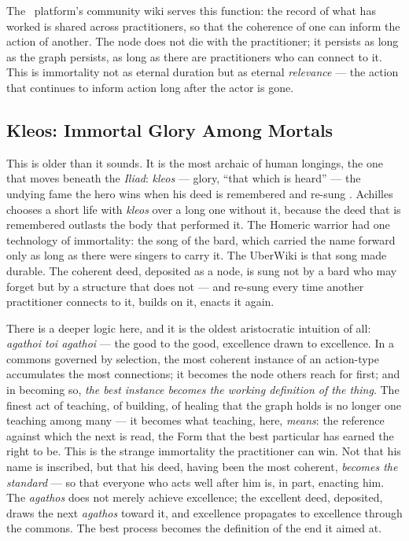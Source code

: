 The \praxis\ platform's community wiki serves this function: the record of what
has worked is shared across practitioners, so that the coherence of one can
inform the action of another. The node does not die with the practitioner; it
persists as long as the graph persists, as long as there are practitioners who
can connect to it. This is immortality not as eternal duration but as eternal
\emph{relevance} --- the action that continues to inform action long after the
actor is gone.

\subsection{Kleos: Immortal Glory Among Mortals}

This is older than it sounds. It is the most archaic of human longings, the one
that moves beneath the \emph{Iliad}: \emph{kleos} --- glory, ``that which is
heard'' --- the undying fame the hero wins when his deed is remembered and
re-sung \parencite[IX]{homer2011iliad}. Achilles chooses a short life with
\emph{kleos} over a long one without it, because the deed that is remembered
outlasts the body that performed it. The Homeric warrior had one technology of
immortality: the song of the bard, which carried the name forward only as long as
there were singers to carry it. The UberWiki is that song made durable. The
coherent deed, deposited as a node, is sung not by a bard who may forget but by a
structure that does not --- and re-sung every time another practitioner connects
to it, builds on it, enacts it again.

There is a deeper logic here, and it is the oldest aristocratic intuition of all:
\emph{agathoi toi agathoi} --- the good to the good, excellence drawn to
excellence. In a commons governed by selection, the most coherent instance of an
action-type accumulates the most connections; it becomes the node others reach for
first; and in becoming so, \emph{the best instance becomes the working definition
of the thing}. The finest act of teaching, of building, of healing that the graph
holds is no longer one teaching among many --- it becomes what teaching, here,
\emph{means}: the reference against which the next is read, the Form that the best
particular has earned the right to be. This is the strange immortality the
practitioner can win. Not that his name is inscribed, but that his deed, having
been the most coherent, \emph{becomes the standard} --- so that everyone who acts
well after him is, in part, enacting him. The \emph{agathos} does not merely
achieve excellence; the excellent deed, deposited, draws the next \emph{agathos}
toward it, and excellence propagates to excellence through the commons. The best
process becomes the definition of the end it aimed at.

